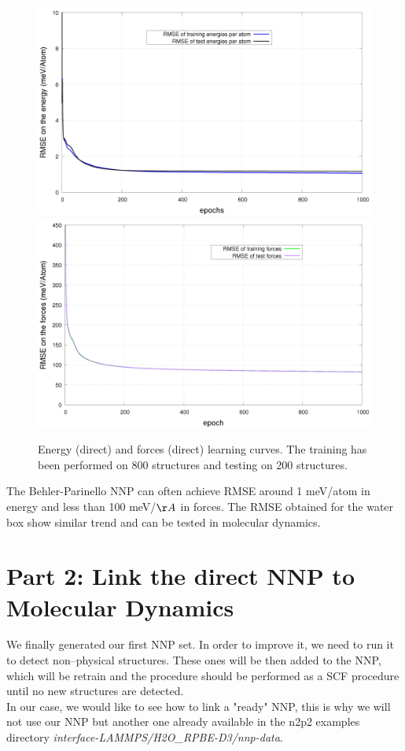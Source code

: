 \documentclass[12pt]{article}
\begin{document}
\begin{figure}
    \centering
    \includegraphics[scale=0.2]{energy.png}
    \includegraphics[scale=0.2]{forces.png}
    \caption{Energy (direct) and forces (direct) learning curves. The training has been performed on 800 structures and testing on 200 structures.}
    \label{fig:my_label}
\end{figure}

The Behler-Parinello NNP can often achieve RMSE around 1 meV/atom in energy and  less than 100 meV/$\AA$ in forces. The RMSE obtained for the water box show similar trend and can be tested in molecular dynamics.

\newpage
{}
\section{Part 2: Link the direct NNP to Molecular Dynamics}
We finally generated our first NNP set. In order to improve it, we need to run it to detect non--physical structures. These ones will be then added to the NNP, which will be retrain and the procedure should be performed as a SCF procedure until no new structures are detected. \\
In our case, we would like to see how to link a "ready" NNP, this is why we will not use our NNP but another one already available in the n2p2 examples directory \textit{interface-LAMMPS/H2O\_RPBE-D3/nnp-data}.
%
\end{document}

